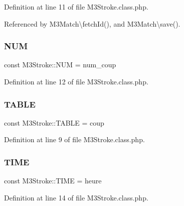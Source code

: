 Definition at line 11 of file M3\+Stroke.\+class.\+php.



Referenced by M3\+Match\textbackslash{}fetch\+Id(), and M3\+Match\textbackslash{}save().

\mbox{\label{class_m3_stroke_af5f8d0256e0cc0bc2cda662f66b8dbdd}} 
\subsubsection{\texorpdfstring{N\+UM}{NUM}}
{\footnotesize\ttfamily const M3\+Stroke\+::\+N\+UM = \textquotesingle{}num\+\_\+coup\textquotesingle{}}



Definition at line 12 of file M3\+Stroke.\+class.\+php.

\mbox{\label{class_m3_stroke_acf45f0322381e34882812c24a7e5c03a}} 
\subsubsection{\texorpdfstring{T\+A\+B\+LE}{TABLE}}
{\footnotesize\ttfamily const M3\+Stroke\+::\+T\+A\+B\+LE = \textquotesingle{}coup\textquotesingle{}}



Definition at line 9 of file M3\+Stroke.\+class.\+php.

\mbox{\label{class_m3_stroke_a9343eac5bb4d02af023037a5e291dc15}} 
\subsubsection{\texorpdfstring{T\+I\+ME}{TIME}}
{\footnotesize\ttfamily const M3\+Stroke\+::\+T\+I\+ME = \textquotesingle{}heure\textquotesingle{}}



Definition at line 14 of file M3\+Stroke.\+class.\+php.

\mbox{\label{class_m3_stroke_af61ac49a60735e49327ac3f05bbebec4}} 
